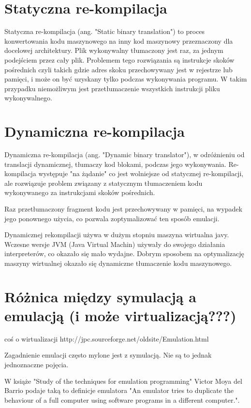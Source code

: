 	\section{Statyczna re-kompilacja}
	Statyczna re-kompilacja (ang. "Static binary translation") to proces konwertowania kodu maszynowego na inny kod maszynowy przeznaczony dla docelowej architektury. Plik wykonywalny tłumaczony jest raz, za jednym podejściem przez cały plik. Problemem tego rozwiązania są instrukcje skoków pośrednich czyli takich gdzie adres skoku przechowywany jest w rejestrze lub pamięci, i może on być uzyskany tylko podczas wykonywania programu. W takim przypadku niemożliwym jest przetłumaczenie wszystkich instrukcji pliku wykonywalnego\cite{uqbt}. 
	
	
	\section{Dynamiczna re-kompilacja}
	Dynamiczna re-kompilacja (ang. "Dynamic binary translator"), w odróżnieniu od translacji dynamicznej, tłumaczy kod blokami, podczas jego wykonywania. Re-kompilacja występuje "na żądanie" co jest wolniejsze od statycznej re-kompilacji, ale rozwiązuje problem związany z statycznym tłumaczeniem kodu wykonywanego za instrukcjami skoków pośrednich.
	
	Raz przetłumaczony fragment kodu jest przechowywany w pamięci, na wypadek jego ponownego użycia, co pozwala zoptymalizować ten sposób emulacji\cite{uqbt}.
	
	
	Dynamicznej rekompilacji używa w dużym stopniu maszyna wirtualna javy. Wczesne wersje JVM (Java Virtual Machin) używały do swojego działania interpreterów, co okazało się mało wydajne. Dobrym sposobem na optymalizację maszyny wirtualnej okazało się dynamiczne tłumaczenie kodu maszynowego\cite{dynamicRecompilationInJava}. 
	
	
	
	\section{Różnica między symulacją a emulacją (i może virtualizacją???)} 
	coś o wirtualizacji http://jpc.sourceforge.net/oldsite/Emulation.html
	
	Zagadnienie emulacji często mylone jest z symulacją. Nie są to jednak jednoznaczne pojęcia.
	
	W książe "Study of the techniques for emulation
	programming" Victor Moya del Barrio podaje taką to definicje emulatora "An emulator tries to duplicate the behaviour of a full computer using software programs in a different computer."\cite{studyofthetechniquesforemulationprogramming}. 